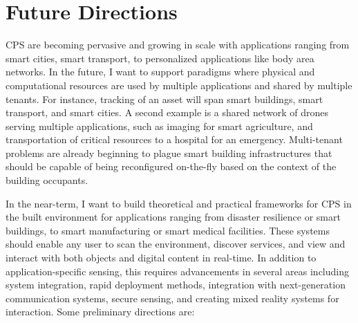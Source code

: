 \documentclass[10pt]{article}
\begin{document}
\section{Future Directions}

CPS are becoming pervasive and growing in scale with applications ranging from smart cities, smart transport, 
to personalized applications like body area networks.  %
In the future, I want to support 
paradigms where physical and computational resources are used by multiple applications and shared by multiple tenants.  For instance, tracking of an asset will span smart buildings, smart transport, and smart cities.  A second example is a shared network of drones serving multiple applications, such as imaging for smart agriculture, and transportation of critical resources to a hospital for an emergency. Multi-tenant problems are already beginning to plague smart building infrastructures that %
should be capable of being reconfigured on-the-fly based on the context of the building occupants. %


In the near-term, I want to build theoretical and practical frameworks for CPS in the built environment for applications ranging from disaster resilience or smart buildings, to smart manufacturing or smart medical facilities. 
These systems should enable any user to scan the environment, discover services, and view and interact with both objects and digital content in real-time. %
In addition to application-specific sensing, this requires advancements in several areas including system integration, rapid deployment methods, integration with next-generation communication systems, secure sensing, and creating mixed reality systems for interaction. Some preliminary directions are:
\end{document}
